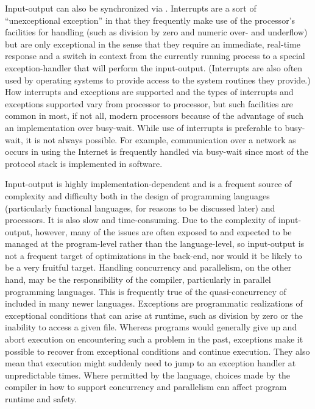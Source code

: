Input-output can also be synchronized via . Interrupts are a sort of ``unexceptional exception'' in that they frequently make use of the processor's facilities for handling  (such as division by zero and numeric over- and underflow) but are only exceptional in the sense that they require an immediate, real-time response and a switch in context from the currently running process to a special exception-handler that will perform the input-output. (Interrupts are also often used by operating systems to provide access to the system routines they provide.) How interrupts and exceptions are supported and the types of interrupts and exceptions supported vary from processor to processor, but such facilities are common in most, if not all, modern processors because of the advantage of such an implementation over busy-wait. While use of interrupts is preferable to busy-wait, it is not always possible. For example, communication over a network as occurs in using the Internet is frequently handled via busy-wait since most of the protocol stack is implemented in software.

Input-output is highly implementation-dependent and is a frequent source of complexity and difficulty both in the design of programming languages (particularly functional languages, for reasons to be discussed later) and processors. %
It is also slow and time-consuming. Due to the complexity of input-output, however, many of the issues are often exposed to and expected to be managed at the program-level rather than the language-level, so input-output is not a frequent target of optimizations in the back-end, nor would it be likely to be a very fruitful target. Handling concurrency and parallelism, on the other hand, may be the responsibility of the compiler, particularly in parallel programming languages. This is frequently true of the quasi-concurrency of  included in many newer languages. Exceptions are programmatic realizations of exceptional conditions that can arise at runtime, such as division by zero or the inability to access a given file. Whereas programs would generally give up and abort execution on encountering such a problem in the past, exceptions make it possible to recover from exceptional conditions and continue execution. They also mean that execution might suddenly need to jump to an exception handler at unpredictable times. Where permitted by the language, choices made by the compiler in how to support concurrency and parallelism can affect program runtime and safety.